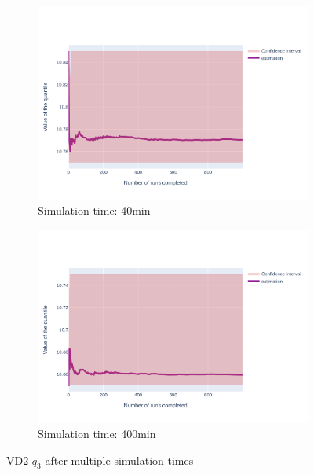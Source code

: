 \documentclass{article}
\begin{document}
\begin{figure}[H]
\begin{subfigure}{.495\textwidth}
    \end{subfigure}
    \begin{subfigure}{.495\textwidth}
        \centering
        \includegraphics[width=\textwidth]{../fig/quantile3/VD2_40mn.png}
        \caption{Simulation time: 40min}
    \end{subfigure}
    \begin{subfigure}{.495\textwidth}
        \centering
        \includegraphics[width=\textwidth]{../fig/quantile3/VD2_400mn.png}
        \caption{Simulation time: 400min}
    \end{subfigure}
    \caption{VD2 $q_3$ after multiple simulation times}
\end{figure}
\end{document}
